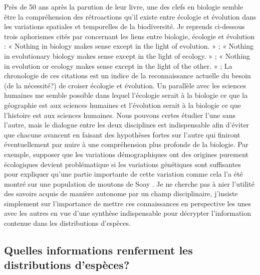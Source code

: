 Près de 50 ans après la parution de leur livre, une des clefs en
biologie semble être la compréhension des rétroactions qu'il existe
entre écologie et évolution dans les variations spatiales et temporelles
de la biodiversité. Je reprends ci-dessous trois aphorismes cités par
\citet{Schoener2011a} concernant les liens entre biologie, écologie et
évolution : « Nothing in biology makes sense except in the light of
evolution. » \citep{Dobzhansky1973}; « Nothing in evolutionary biology
makes sense except in the light of ecology. » \citep{grant2008}; «
Nothing in evolution or ecology makes sense except in the light of the
other. » \citep{Pelletier2009a}; La chronologie de ces citations est un
indice de la reconnaissance actuelle du besoin (de la nécessité?) de
croiser écologie et évolution. Un parallèle avec les sciences humaines
me semble possible dans lequel l'écologie serait à la biologie ce que la
géographie est aux sciences humaines et l'évolution serait à la biologie
ce que l'histoire est aux sciences humaines. Nous pouvons certes étudier
l'une sans l'autre, mais le dialogue entre les deux disciplines est
indispensable afin d'éviter que chacune avancent en faisant des
hypothèses fortes sur l'autre qui finiront éventuellement par nuire à
une compréhension plus profonde de la biologie. Par exemple, supposer
que les variations démographiques ont des origines purement écologiques
devient problématique si les variations génétiques sont suffisantes pour
expliquer qu'une partie importante de cette variation comme cela l'a été
montré sur une population de moutons de Soay \citep{Pelletier2007}. Je
ne cherche pas à nier l'utilité des savoirs acquis de manière autonome
par un champ disciplinaire, j'insiste simplement sur l'importance de
mettre ces connaissances en perspective les unes avec les autres en vue
d'une synthèse indispensable pour décrypter l'information contenue dans
les distributions d'espèces.

\subsection*{Quelles informations renferment les distributions
d'espèces?}\label{quelles-informations-renferment-les-distributions-despuxe8ces}

